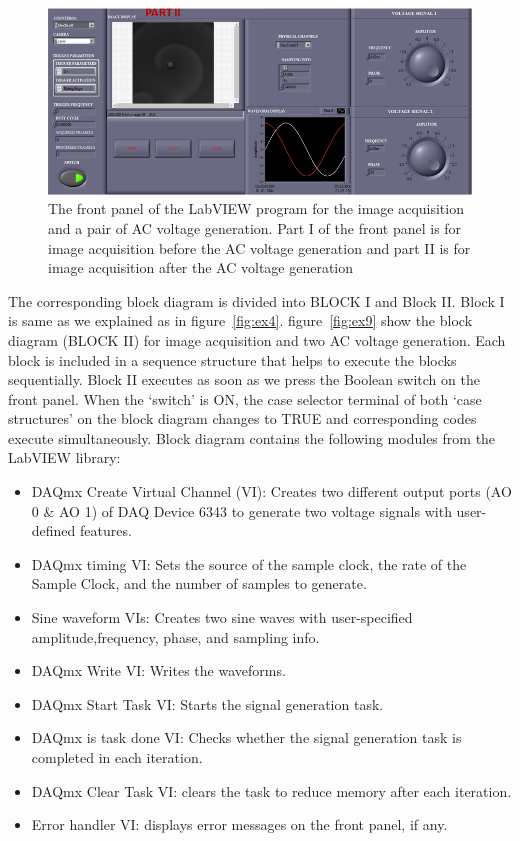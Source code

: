 \documentclass[journal=jacsat,manuscript=article]{achemso}
\begin{document}
\begin{figure}[H]
    \centering
    \includegraphics[width=\linewidth]{polarised.png}
    \caption{The front panel of the LabVIEW program for the image
      acquisition and a pair of AC voltage generation. Part I of the
      front panel is for image acquisition before the AC voltage
      generation and part II is for image acquisition after the AC
      voltage generation}
    \label{fig:ex7}
\end{figure}
The corresponding block diagram is divided into BLOCK I and Block II. Block I is same as we explained as in figure~\ref{fig:ex4}.  figure~\ref{fig:ex9} show the block diagram (BLOCK II) for image acquisition and two AC voltage generation.  Each block is included in a
sequence structure that helps to execute the blocks sequentially. Block II executes as
soon as we press the Boolean switch on the front panel. When the
‘switch’ is ON, the case selector terminal of both ‘case structures’
on the block diagram changes to TRUE and corresponding codes execute
simultaneously. 
Block diagram contains the following modules from the LabVIEW library: 
\begin{itemize}
	\item DAQmx Create Virtual Channel (VI): Creates two different
	output ports (AO 0 \& AO 1) of DAQ Device 6343 to generate two voltage
	signals with user-defined features.
	\item DAQmx timing VI: Sets the source of the sample clock, the rate of the Sample Clock, and the number of samples to generate.
	\item Sine waveform VIs: Creates two sine waves with user-specified amplitude,frequency, phase, and sampling info.
	\item DAQmx Write VI: Writes the waveforms.
	\item DAQmx Start Task VI: Starts the signal generation task.
	\item DAQmx is task done VI: Checks whether the signal generation task is completed in each iteration. 
	\item DAQmx Clear Task VI: clears the task to reduce memory after each iteration.
	\item Error handler VI: displays error messages on the front panel, if any.
\end{itemize}
\end{document}
